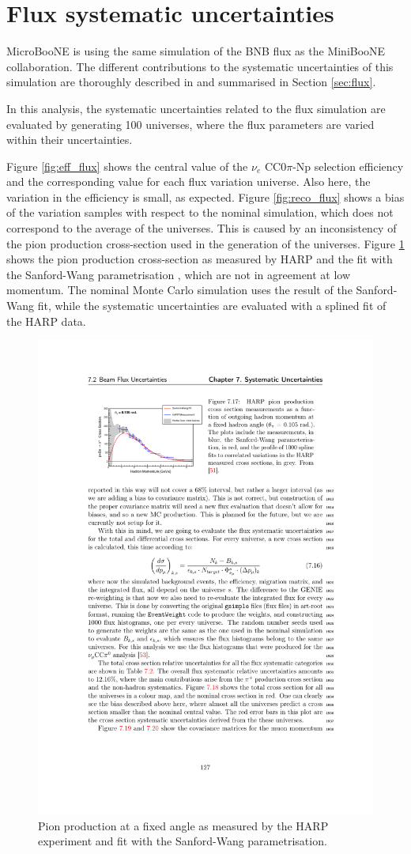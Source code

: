 \section{Flux systematic uncertainties}
MicroBooNE is using the same simulation of the BNB flux as the MiniBooNE collaboration. The different contributions to the systematic uncertainties of this simulation are thoroughly described in \cite{AguilarArevalo:2008yp} and summarised in Section \ref{sec:flux}.

In this analysis, the systematic uncertainties related to the flux simulation are evaluated by generating 100 universes, where the flux parameters are varied within their uncertainties. 

Figure \ref{fig:eff_flux} shows the central value of the $\nu_{e}$ CC0$\pi$-Np selection efficiency and the corresponding value for each flux variation universe. Also here, the variation in the efficiency is small, as expected. 
Figure \ref{fig:reco_flux} shows a bias of the variation samples with respect to the nominal simulation, which does not correspond to the average of the universes. This is caused by an inconsistency of the pion production cross-section used in the generation of the universes. 
Figure \ref{fig:harp} shows the pion production cross-section as measured by HARP \cite{Catanesi:2007ab} and the fit with the Sanford-Wang parametrisation \cite{Sanford:1967zza}, which are not in agreement at low momentum. The nominal Monte Carlo simulation uses the result of the Sanford-Wang fit, while the systematic uncertainties are evaluated with a splined fit of the HARP data.

\begin{figure}[htbp]
\centering  
\includegraphics[width=0.75\linewidth]{figures/harp.pdf}
\caption{Pion production at a fixed angle as measured by the HARP experiment and fit with the Sanford-Wang parametrisation.}\label{fig:harp}
\end{figure}

